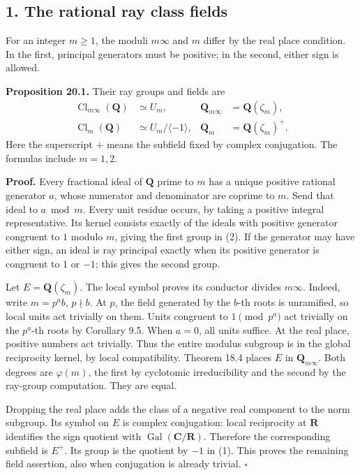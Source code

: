 \documentclass[11pt,a4paper]{article}
\begin{document}
\subsection{1. The rational ray class
fields}\label{the-rational-ray-class-fields}

For an integer \(m\geq1\), the moduli \(m\infty\) and \(m\) differ by
the real place condition. In the first, principal generators must be
positive; in the second, either sign is allowed.

\textbf{Proposition 20.1.} Their ray groups and fields are \[
\begin{aligned}
\operatorname{Cl}_{m\infty}(\mathbf Q)&\simeq U_m,&
\mathbf Q_{m\infty}&=\mathbf Q(\zeta_m),\\
\operatorname{Cl}_{m}(\mathbf Q)&\simeq U_m/\langle-1\rangle,&
\mathbf Q_m&=\mathbf Q(\zeta_m)^+.
\end{aligned}
\tag{2}
\] Here the superscript \(+\) means the subfield fixed by complex
conjugation. The formulas include \(m=1,2\).

\textbf{Proof.} Every fractional ideal of \(\mathbf Q\) prime to \(m\)
has a unique positive rational generator \(a\), whose numerator and
denominator are coprime to \(m\). Send that ideal to \(a\bmod m\). Every
unit residue occurs, by taking a positive integral representative. Its
kernel consists exactly of the ideals with positive generator congruent
to \(1\) modulo \(m\), giving the first group in (2). If the generator
may have either sign, an ideal is ray principal exactly when its
positive generator is congruent to \(1\) or \(-1\); this gives the
second group.

Let \(E=\mathbf Q(\zeta_m)\). The local symbol proves its conductor
divides \(m\infty\). Indeed, write \(m=p^a b\), \(p\nmid b\). At \(p\),
the field generated by the \(b\)-th roots is unramified, so local units
act trivially on them. Units congruent to \(1\pmod{p^a}\) act trivially
on the \(p^a\)-th roots by Corollary 9.5. When \(a=0\), all units
suffice. At the real place, positive numbers act trivially. Thus the
entire modulus subgroup is in the global reciprocity kernel, by local
compatibility. Theorem 18.4 places \(E\) in \(\mathbf Q_{m\infty}\).
Both degrees are \(\varphi(m)\), the first by cyclotomic irreducibility
and the second by the ray-group computation. They are equal.

Dropping the real place adds the class of a negative real component to
the norm subgroup. Its symbol on \(E\) is complex conjugation: local
reciprocity at \(\mathbf R\) identifies the sign quotient with
\(\operatorname{Gal}(\mathbf C/\mathbf R)\). Therefore the corresponding
subfield is \(E^+\). Its group is the quotient by \(-1\) in (1). This
proves the remaining field assertion, also when conjugation is already
trivial. \(\square\)
\end{document}
